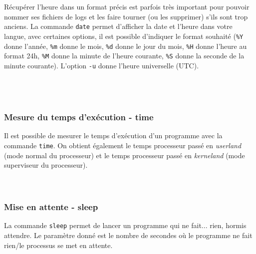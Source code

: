 \bigskip

Récupérer l'heure dans un format précis est parfois très important pour pouvoir nommer ses fichiers de logs et les faire tourner (ou les supprimer) s'ils sont trop anciens.
La commande \texttt{date} permet d'afficher la date et l'heure dans votre langue, avec certaines options, il est possible d'indiquer le format souhaité (\texttt{\%Y} donne l'année, \texttt{\%m} donne le mois, \texttt{\%d} donne le jour du mois, \texttt{\%H} donne l'heure au format 24h, \texttt{\%M} donne la minute de l'heure courante, \texttt{\%S} donne la seconde de la minute courante).
L'option \texttt{-u} donne l'heure universelle (UTC).\\

\\
\\
\\


\bigskip

\subsubsection{Mesure du temps d'exécution - time}

\bigskip

Il est possible de mesurer le temps d'exécution d'un programme avec la commande \texttt{time}.
On obtient également le temps processeur passé en \textit{userland} (mode normal du processeur) et le temps processeur passé en \textit{kerneland} (mode superviseur du processeur).\\

\\
\\


\bigskip

\subsubsection{Mise en attente - sleep}

\bigskip

La commande \texttt{sleep} permet de lancer un programme qui ne fait... rien, hormis attendre.
Le paramètre donné est le nombre de secondes où le programme ne fait rien/le processus se met en attente.\\

\\
\\

